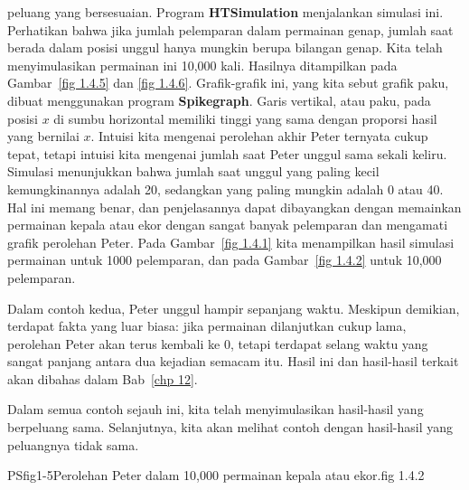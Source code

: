 \begin{example}
peluang yang bersesuaian.  Program {\bf HTSimulation} menjalankan
simulasi ini.  Perhatikan bahwa jika jumlah pelemparan dalam permainan genap,
jumlah saat berada dalam posisi unggul hanya mungkin berupa bilangan genap.  Kita telah menyimulasikan 
permainan ini 10{,}000 kali. 
Hasilnya ditampilkan pada Gambar~\ref{fig 1.4.5} dan \ref{fig 1.4.6}.  Grafik-grafik ini,
yang kita sebut grafik paku, dibuat menggunakan program {\bf Spikegraph}.
Garis vertikal, atau paku, pada posisi $x$ di sumbu horizontal memiliki tinggi yang sama dengan
proporsi hasil yang bernilai
$x$.  Intuisi kita mengenai perolehan akhir Peter ternyata cukup tepat, tetapi intuisi kita
mengenai jumlah saat Peter unggul sama sekali keliru.  Simulasi
menunjukkan bahwa jumlah saat unggul yang paling kecil kemungkinannya adalah 20, sedangkan yang paling mungkin adalah 0
atau 40.  Hal ini memang benar, dan penjelasannya dapat dibayangkan dengan memainkan
permainan kepala atau ekor dengan sangat banyak pelemparan dan mengamati grafik
perolehan Peter.  Pada Gambar~\ref{fig 1.4.1} kita menampilkan hasil simulasi permainan untuk
1000 pelemparan, dan pada Gambar~\ref{fig 1.4.2} untuk 10{,}000 pelemparan.
\par
Dalam contoh kedua, Peter unggul hampir sepanjang waktu.  Meskipun demikian, terdapat fakta yang luar biasa:
jika permainan dilanjutkan cukup lama, perolehan Peter akan terus
kembali ke 0, tetapi terdapat selang waktu yang sangat panjang antara dua kejadian
semacam itu.  Hasil ini dan hasil-hasil terkait akan dibahas dalam
Bab~\ref{chp 12}.
\end{example}

Dalam semua contoh sejauh ini, kita telah menyimulasikan hasil-hasil yang berpeluang sama.  Selanjutnya,
kita akan melihat contoh dengan hasil-hasil yang peluangnya tidak sama.




 {PSfig1-5}{Perolehan Peter dalam 10,000 permainan kepala atau ekor.}{fig 1.4.2}


